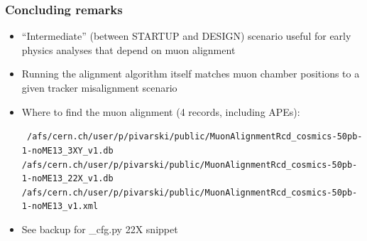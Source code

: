\documentclass[compress]{beamer}
\begin{document}

\begin{frame}
\frametitle{Concluding remarks}

\begin{itemize}\setlength{\itemsep}{0.35 cm}
\item ``Intermediate'' (between STARTUP and DESIGN) scenario useful
  for early physics analyses that depend on muon alignment
\item Running the alignment algorithm itself matches muon chamber
  positions to a given tracker misalignment scenario
\item Where to find the muon alignment (4 records, including APEs):

{\tiny \tt
/afs/cern.ch/user/p/pivarski/public/MuonAlignmentRcd\_cosmics-50pb-1-noME13\_3XY\_v1.db
/afs/cern.ch/user/p/pivarski/public/MuonAlignmentRcd\_cosmics-50pb-1-noME13\_22X\_v1.db
/afs/cern.ch/user/p/pivarski/public/MuonAlignmentRcd\_cosmics-50pb-1-noME13\_v1.xml
}

\item See backup for \_cfg.py 22X snippet
\end{itemize}

\label{numpages}
\end{frame}
\end{document}
